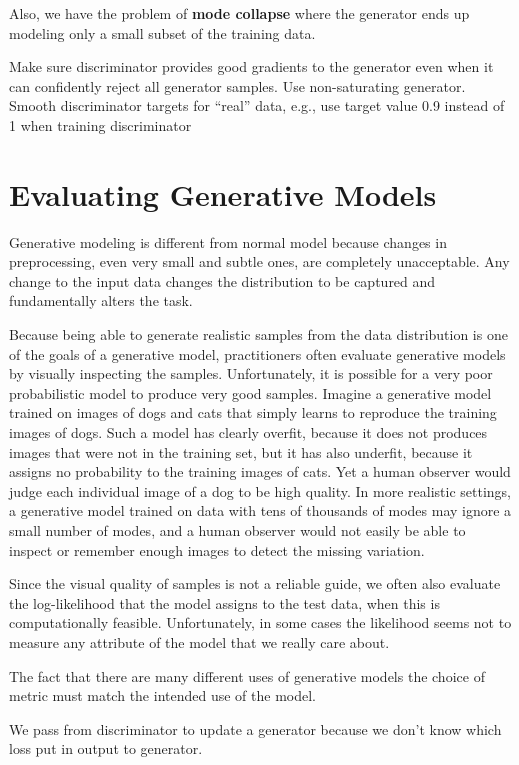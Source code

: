 Also, we have the problem of \textbf{mode collapse} where the generator ends up modeling only a small
subset of the training data.

Make sure discriminator provides good gradients to the generator even when it can confidently reject all 
generator samples. Use non-saturating generator. Smooth discriminator targets for “real” data, e.g., use
target value 0.9 instead of 1 when training discriminator

\section{Evaluating Generative Models}
Generative modeling is different from normal model because changes in preprocessing, even very small and 
subtle ones, are completely unacceptable. Any change to the input data changes the distribution to be 
captured and fundamentally alters the task.

Because being able to generate realistic samples from the data distribution is one of the goals of a 
generative model, practitioners often evaluate generative models by visually inspecting the samples. 
Unfortunately, it is possible for a very poor probabilistic model to produce very good samples. Imagine a 
generative model trained on images of dogs and cats that simply learns to reproduce the training images of 
dogs. Such a model has clearly overfit, because it does not produces images that were not in the training 
set, but it has also underfit, because it assigns no probability to the training images of cats. Yet a 
human observer would judge each individual image of a dog to be high quality. In more realistic settings, 
a generative model trained on data with tens of thousands of modes may ignore a small number of modes, and 
a human observer would not easily be able to inspect or remember  enough images to detect the missing 
variation.

Since the visual quality of samples is not a reliable guide, we often also evaluate the log-likelihood 
that the model assigns to the test data, when this is computationally feasible. Unfortunately, in some 
cases the likelihood seems not to measure any attribute of the model that we really care about.

The fact that there are many different uses of generative models the choice of metric must match the 
intended use of the model.


We pass from discriminator to update a generator because we don't know which loss put in output to generator.